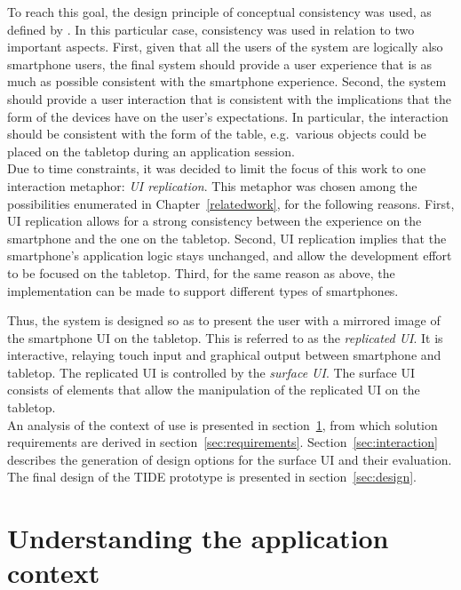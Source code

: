 To reach this goal, the design principle of conceptual consistency was used, as defined by \cite{Benyon:2010}.
In this particular case, consistency was used in relation to two important aspects.
First, given that all the users of the system are logically also smartphone users, the final system should provide a user experience that is as much as possible consistent with the smartphone experience.
Second, the system should provide a user interaction that is consistent with the implications that the form of the devices have on the user's expectations.
In particular, the interaction should be consistent with the form of the table, e.g.\ various objects could be placed on the tabletop during an application session.
\\
\linebreak
Due to time constraints, it was decided to limit the focus of this work to one interaction metaphor: \emph{UI replication}.
This metaphor was chosen among the possibilities enumerated in Chapter~\ref{relatedwork}, for the following reasons.
First, UI replication allows for a strong consistency between the experience on the smartphone and the one on the tabletop.
Second, UI replication implies that the smartphone's application logic stays unchanged, and allow the development effort to be focused on the tabletop.
Third, for the same reason as above, the implementation can be made to support different types of smartphones.

Thus, the system is designed so as to present the user with a mirrored image of the smartphone UI on the tabletop.
This is referred to as the \emph{replicated UI}.
It is interactive, relaying touch input and graphical output between smartphone and tabletop.
The replicated UI is controlled by the \emph{surface UI}.
The surface UI consists of elements that allow the manipulation of the replicated UI on the tabletop.
\\
\linebreak
An analysis of the context of use is presented in section~\ref{sec:context}, from which solution requirements are derived in section~\ref{sec:requirements}.
Section~\ref{sec:interaction} describes the generation of design options for the surface UI and their evaluation.
The final design of the TIDE prototype is presented in section~\ref{sec:design}.

\section{Understanding the application context}
\label{sec:context}

